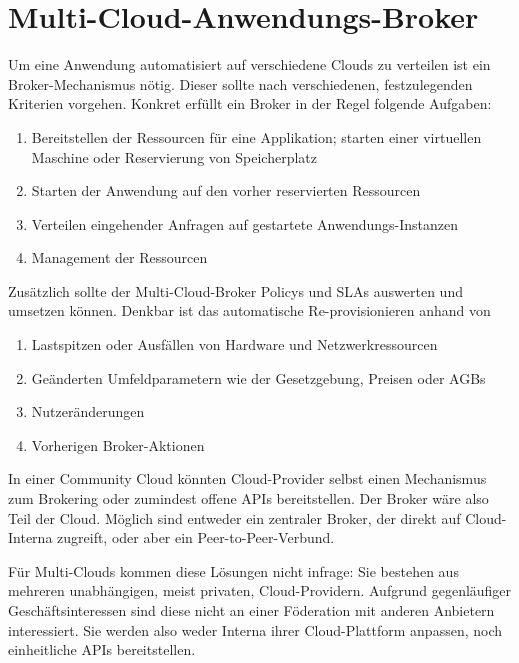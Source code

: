 \chapter{Multi-Cloud-Anwendungs-Broker}
\label{cha:broker}


Um eine Anwendung automatisiert auf verschiedene Clouds zu verteilen ist ein Broker-Mechanismus nötig. Dieser sollte nach verschiedenen, festzulegenden Kriterien vorgehen. Konkret erfüllt ein Broker in der Regel folgende Aufgaben:

\begin{enumerate}
	\item Bereitstellen der Ressourcen für eine Applikation; starten einer virtuellen Maschine oder Reservierung von Speicherplatz
	\item Starten der Anwendung auf den vorher reservierten Ressourcen
	\item Verteilen eingehender Anfragen auf gestartete Anwendungs-Instanzen
	\item Management der Ressourcen
\end{enumerate}

\noindent
Zusätzlich sollte der Multi-Cloud-Broker Policys und SLAs auswerten und umsetzen können. Denkbar ist das automatische Re-provisionieren anhand von 

\begin{enumerate}
	\item Lastspitzen oder Ausfällen von Hardware und Netzwerkressourcen 
	\item Geänderten Umfeldparametern wie der Gesetzgebung, Preisen oder AGBs
	\item Nutzeränderungen
	\item Vorherigen Broker-Aktionen
\end{enumerate}

\noindent
In einer Community Cloud könnten Cloud-Provider selbst einen Mechanismus zum Brokering oder zumindest offene APIs bereitstellen. Der Broker wäre also Teil der Cloud. Möglich sind entweder ein zentraler Broker, der direkt auf Cloud-Interna zugreift, oder aber ein Peer-to-Peer-Verbund.

Für Multi-Clouds kommen diese Lösungen nicht infrage: Sie bestehen aus mehreren unabhängigen, meist privaten, Cloud-Providern. Aufgrund gegenläufiger Geschäftsinteressen sind diese nicht an einer Föderation mit anderen Anbietern interessiert. Sie werden also weder Interna ihrer Cloud-Plattform anpassen, noch einheitliche APIs bereitstellen.


